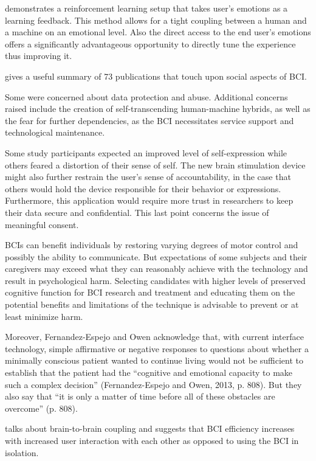 \documentclass[fleqn,11pt]{olplainarticle}
\begin{document}
\cite{shih2017deep} demonstrates a reinforcement learning setup that takes user's emotions as a learning feedback. This method allows for a tight coupling between a human and a machine on an emotional level. Also the direct access to the end user's emotions offers a significantly advantageous opportunity to directly tune the experience thus improving it.

\cite{kogel2019using} gives a useful summary of 73 publications that touch upon social aspects of BCI.

Some were concerned about data protection and abuse. Additional concerns raised include the creation of self-transcending human-machine hybrids, as well as the fear for further dependencies, as the BCI necessitates service support and technological maintenance.\cite{kogel2019using} 

Some study participants expected an improved level of self-expression while others feared a distortion of their sense of self. The new brain stimulation device might also further restrain the user’s sense of accountability, in the case that others would hold the device responsible for their behavior or expressions. Furthermore, this application would require more trust in researchers to keep their data secure and confidential. This last point concerns the issue of meaningful consent.\cite{kogel2019using} 


BCIs can benefit individuals by restoring varying degrees of motor control and possibly the ability to communicate. But expectations of some subjects and their caregivers may exceed what they can reasonably achieve with the technology and result in psychological harm. Selecting candidates with higher levels of preserved cognitive function for BCI research and treatment and educating them on the potential benefits and limitations of the technique is advisable to prevent or at least minimize harm.\cite{glannon2014ethical}

Moreover, Fernandez-Espejo and Owen acknowledge that, with current interface technology, simple affirmative or negative responses to questions about whether a minimally conscious patient wanted to continue living would not be sufficient to establish that the patient had the “cognitive and emotional capacity to make such a complex decision” (Fernandez-Espejo and Owen, 2013, p. 808). But they also say that “it is only a matter of time before all of these obstacles are overcome” (p. 808).\cite{glannon2014ethical}

\cite{sexton2015overlooked} talks about brain-to-brain coupling and suggests that BCI efficiency increases with increased user interaction with each other as opposed to using the BCI in isolation.
\end{document}

